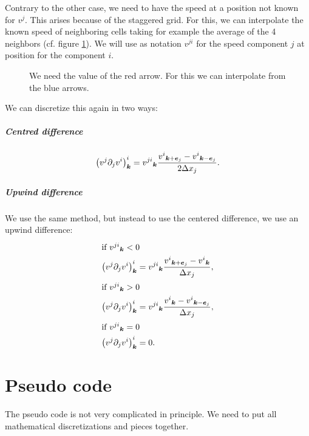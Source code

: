 \begin{remark}
  Contrary to the other case, we need to have the speed at a position not known for $v^{j}$. This arises because of the staggered grid.
  For this, we can interpolate the known speed of neighboring cells taking for example the average of the 4 neighbors (cf. figure \ref{fixed:staggered_convection_upwind}).
  We will use as notation $v^{ji}$ for the speed component $j$ at position for the component $i$.
  
  \begin{figure}
    \caption{We need the value of the red arrow. For this we can interpolate from  the blue arrows.}
    \label{fixed:staggered_convection_upwind}
    \end{figure}
\end{remark}
We can discretize this again in two ways:

\subparagraph{Centred difference}
\begin{equation}
\left(v^{j}\partial_{j}v^{i}\right)^{i}_{{\boldsymbol {k}}}={v^{ji}}_{{\boldsymbol {k}}}\frac{{v^{i}}_{{\boldsymbol {k}}+{\boldsymbol {e}}_j}-{v^{i}}_{{\boldsymbol {k}}-{\boldsymbol {e}}_j}}{2\Delta x_{j}}.
\end{equation}

\subparagraph{Upwind difference}

We use the same method, but instead to use the centered difference, we use an upwind difference:
\begin{align}
\intertext{if ${v^{ji}}_{{\boldsymbol {k}}}<0$}
\left(v^{j}\partial_{j}v^{i}\right)^{i}_{{\boldsymbol {k}}}&={v^{ji}}_{{\boldsymbol {k}}}\frac{{v^{i}}_{{\boldsymbol {k}}+{\boldsymbol {e}}_j}-{v^{i}}_{{\boldsymbol {k}}}}{\Delta x_{j}},\\
\intertext{if ${v^{ji}}_{{\boldsymbol {k}}}>0$}
\left(v^{j}\partial_{j}v^{i}\right)^{i}_{{\boldsymbol {k}}}&={v^{ji}}_{{\boldsymbol {k}}}\frac{{v^{i}}_{{\boldsymbol {k}}}-{v^{i}}_{{\boldsymbol {k}}-{\boldsymbol {e}}_j}}{\Delta x_{j}},\\
\intertext{if ${v^{ji}}_{{\boldsymbol {k}}}=0$}
\left(v^{j}\partial_{j}v^{i}\right)^{i}_{{\boldsymbol {k}}}&=0.
\end{align}

\FloatBarrier
\section{Pseudo code}

The pseudo code is not very complicated in principle.
We need to put all mathematical discretizations and pieces together.

